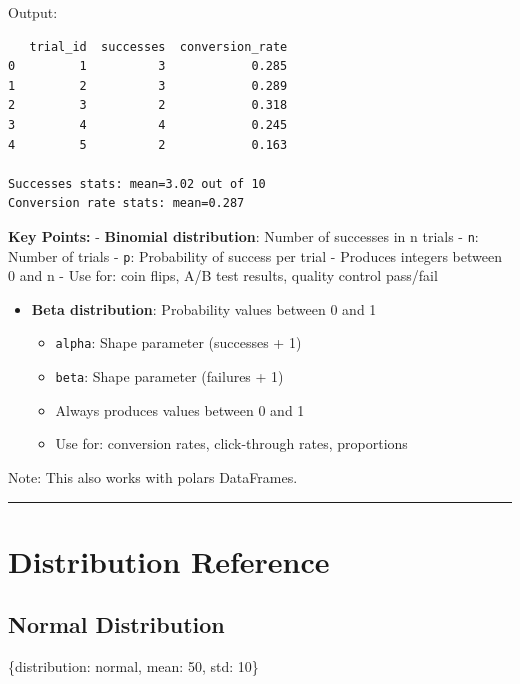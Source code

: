 \documentclass[
  letterpaper,
]{scrbook}
\newenvironment{Shaded}{\begin{snugshade}}{\end{snugshade}}
\newcommand{\DecValTok}[1]{\textcolor[rgb]{0.68,0.00,0.00}{#1}}
\newcommand{\NormalTok}[1]{\textcolor[rgb]{0.00,0.23,0.31}{#1}}
\newcommand{\StringTok}[1]{\textcolor[rgb]{0.13,0.47,0.30}{#1}}
\providecommand{\tightlist}{%
  \setlength{\itemsep}{0pt}\setlength{\parskip}{0pt}}
\begin{document}
Output:

\begin{verbatim}
   trial_id  successes  conversion_rate
0         1          3            0.285
1         2          3            0.289
2         3          2            0.318
3         4          4            0.245
4         5          2            0.163

Successes stats: mean=3.02 out of 10
Conversion rate stats: mean=0.287
\end{verbatim}

\textbf{Key Points:} - \textbf{Binomial distribution}: Number of
successes in n trials - \texttt{n}: Number of trials - \texttt{p}:
Probability of success per trial - Produces integers between 0 and n -
Use for: coin flips, A/B test results, quality control pass/fail

\begin{itemize}
\tightlist
\item
  \textbf{Beta distribution}: Probability values between 0 and 1

  \begin{itemize}
  \tightlist
  \item
    \texttt{alpha}: Shape parameter (successes + 1)
  \item
    \texttt{beta}: Shape parameter (failures + 1)
  \item
    Always produces values between 0 and 1
  \item
    Use for: conversion rates, click-through rates, proportions
  \end{itemize}
\end{itemize}

Note: This also works with polars DataFrames.

\begin{center}\rule{0.5\linewidth}{0.5pt}\end{center}

\section{Distribution Reference}\label{distribution-reference}

\subsection{Normal Distribution}\label{normal-distribution}

\begin{Shaded}
\begin{Highlighting}[]
\NormalTok{\{}\StringTok{\textquotesingle{}distribution\textquotesingle{}}\NormalTok{: }\StringTok{\textquotesingle{}normal\textquotesingle{}}\NormalTok{, }\StringTok{\textquotesingle{}mean\textquotesingle{}}\NormalTok{: }\DecValTok{50}\NormalTok{, }\StringTok{\textquotesingle{}std\textquotesingle{}}\NormalTok{: }\DecValTok{10}\NormalTok{\}}
\end{Highlighting}
\end{Shaded}
\end{document}
